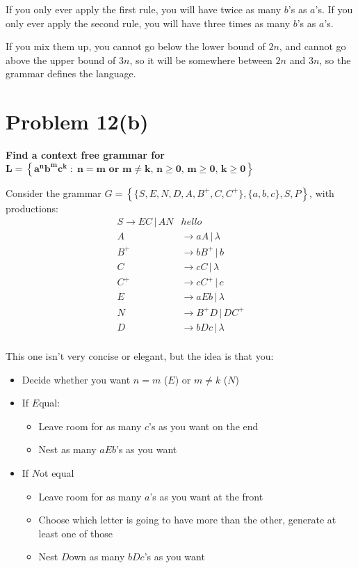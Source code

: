 \documentclass{report}
\begin{document}
If you only ever apply the first rule, you will have twice as many $b$'s as $a$'s.
If you only ever apply the second rule, you will have three times as many $b$'s as $a$'s.

If you mix them up, you cannot go below the lower bound of $2n$, and cannot go above the upper bound of $3n$, so it will be somewhere
between $2n$ and $3n$, so the grammar defines the language.

\section*{Problem 12(b)}
\textbf{Find a context free grammar for \\ $\mathbf{ L = \left\{  a^nb^mc^k \; : \; n = m \text{ or } m \neq k    ,\, n \geq 0,\, m \geq 0 ,\, k \geq 0  \right\} }$}

Consider the grammar $G = \left\{ \{S, E, N, D, A, B^+, C, C^+\}, \{a, b, c\}, S, P \right\}$, with productions:
\begin{align*}
                S \rightarrow EC \, | \, AN & hello \\
                A &\rightarrow aA \, | \, \lambda\\
                B^+ &\rightarrow bB^+ \, | \, b \\
                C &\rightarrow cC \, | \, \lambda \\
                C^+ &\rightarrow cC^+ \,|\, c \\
                E &\rightarrow  a E b \, | \, \lambda\\
                N &\rightarrow B^+D \, | \, DC^+ \\
                D &\rightarrow bDc \, | \, \lambda \\
\end{align*}

This one isn't very concise or elegant, but the idea is that you:
\begin{itemize}
        \item Decide whether you want $n=m$ ($E$) or $m \neq k$ ($N$)
        \item If $E$qual:
        \begin{itemize}
                \item Leave room for as many $c$'s as you want on the end
                \item Nest as many $aEb$'s as you want
        \end{itemize}
        \item If $N$ot equal
        \begin{itemize}
                \item Leave room for as many $a$'s as you want at the front
                \item Choose which letter is going to have more than the other, generate at least one of those
                \item Nest $D$own as many $bDc$'s as you want
        \end{itemize}
\end{itemize}
\end{document}
